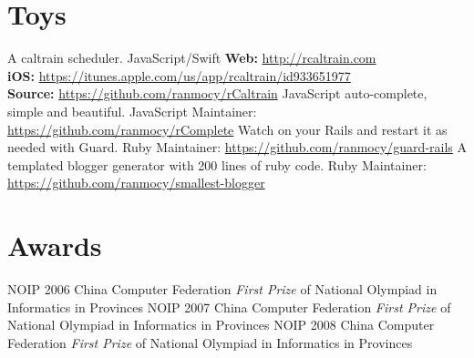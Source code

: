 \documentclass[]{friggeri-cv} %
\begin{document}

\section{Toys}

\begin{entrylist}
  {A caltrain scheduler.}
  {JavaScript/Swift}
  {
  \textbf{Web:} \url{http://rcaltrain.com}\\
  \textbf{iOS:} \url{https://itunes.apple.com/us/app/rcaltrain/id933651977}\\
  \textbf{Source:} \url{https://github.com/ranmocy/rCaltrain}
  }
  {JavaScript auto-complete, simple and beautiful.}
  {JavaScript}
  {
  Maintainer: \url{https://github.com/ranmocy/rComplete}
  }
  {Watch on your Rails and restart it as needed with Guard.}
  {Ruby}
  {
  Maintainer: \url{https://github.com/ranmocy/guard-rails}
  }
  {A templated blogger generator with 200 lines of ruby code.}
  {Ruby}
  {
  Maintainer: \url{https://github.com/ranmocy/smallest-blogger}
  }
\end{entrylist}


\section{Awards}

\begin{entrylist}
  {NOIP 2006}
  {China Computer Federation}
  {\emph{First Prize} of National Olympiad in Informatics in Provinces}
  {NOIP 2007}
  {China Computer Federation}
  {\emph{First Prize} of National Olympiad in Informatics in Provinces}
  {NOIP 2008}
  {China Computer Federation}
  {\emph{First Prize} of National Olympiad in Informatics in Provinces}
\end{entrylist}
\end{document}
